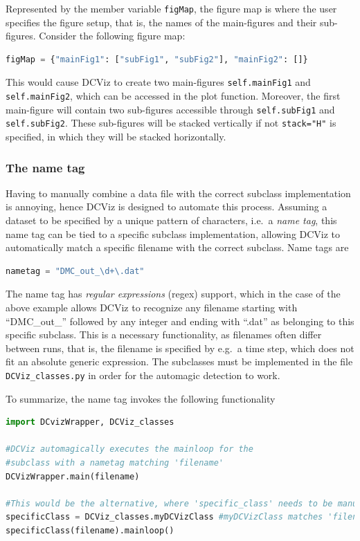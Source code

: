 Represented by the member variable \verb+figMap+, the figure map is where the user specifies the figure setup, that is, the names of the main-figures and their sub-figures. Consider the following figure map:  

\begin{lstlisting}[language=Python]
figMap = {"mainFig1": ["subFig1", "subFig2"], "mainFig2": []} 
\end{lstlisting}

This would cause DCViz to create two main-figures \verb+self.mainFig1+ and \verb+self.mainFig2+, which can be accessed in the plot function. Moreover, the first main-figure will contain two sub-figures accessible through \verb+self.subFig1+ and \verb+self.subFig2+. These sub-figures will be stacked vertically if not \verb+stack="H"+ is specified, in which they will be stacked horizontally. 


\subsubsection{The name tag}

Having to manually combine a data file with the correct subclass implementation is annoying, hence DCViz is designed to automate this process. Assuming a dataset to be specified by a unique pattern of characters, i.e.~a \textit{name tag}, this name tag can be tied to a specific subclass implementation, allowing DCViz to automatically match a specific filename with the correct subclass. Name tags are

\begin{lstlisting}[language=Python]
 nametag = "DMC_out_\d+\.dat"
\end{lstlisting}

The name tag has \textit{regular expressions} (regex) support, which in the case of the above example allows DCViz to recognize any filename starting with ``DMC\_out\_'' followed by any integer and ending with ``.dat'' as belonging to this specific subclass. This is a necessary functionality, as filenames often differ between runs, that is, the filename is specified by e.g.~a time step, which does not fit an absolute generic expression. The subclasses must be implemented in the file \verb+DCViz_classes.py+ in order for the automagic detection to work.

To summarize, the name tag invokes the following functionality

\begin{lstlisting}[language=Python]
import DCvizWrapper, DCViz_classes

#DCViz automagically executes the mainloop for the 
#subclass with a nametag matching 'filename'
DCVizWrapper.main(filename) 

#This would be the alternative, where 'specific_class' needs to be manually selected.
specificClass = DCViz_classes.myDCVizClass #myDCVizClass matches 'filename'
specificClass(filename).mainloop()
\end{lstlisting}


